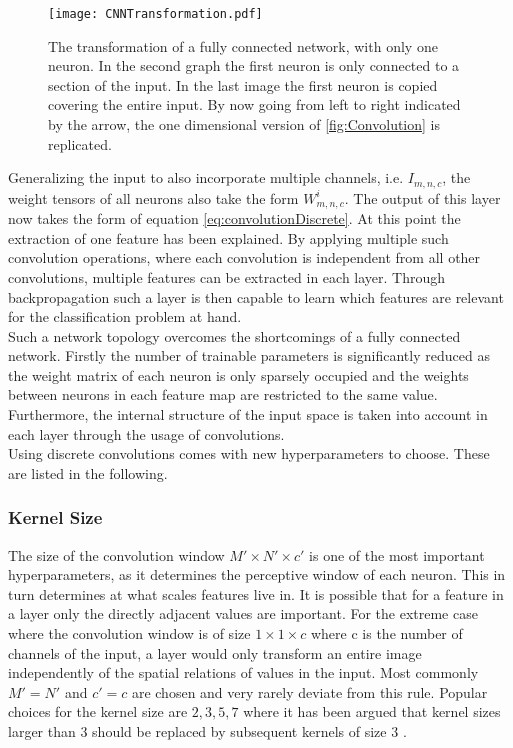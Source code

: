 \begin{figure}[H]
\centering
\texttt{[image: CNNTransformation.pdf]}
\caption{The transformation of a fully connected network, with only one neuron. In the second graph the first neuron is only connected to a section of the input. In the last image the first neuron is copied covering the entire input. By now going from left to right indicated by the arrow, the one dimensional version of \ref{fig:Convolution} is replicated.}
\label{fig:CNNTransformation}
\end{figure}

Generalizing the input to also incorporate multiple channels, i.e. $I_{m,n,c}$, the weight tensors of all neurons also take the form $W^i_{m,n,c}$. The output of this layer now takes the form of equation \ref{eq:convolutionDiscrete}. At this point the extraction of one feature has been explained. By applying multiple such convolution operations, where each convolution is independent from all other convolutions, multiple features can be extracted in each layer. Through backpropagation such a layer is then capable to learn which features are relevant for the classification problem at hand. \\

Such a network topology overcomes the shortcomings of a fully connected network. Firstly the number of trainable parameters is significantly reduced as the weight matrix of each neuron is only sparsely occupied and the weights between neurons in each feature map are restricted to the same value. Furthermore, the internal structure of the input space is taken into account in each layer through the usage of convolutions. \\

Using discrete convolutions comes with new hyperparameters to choose. These are listed in the following.

\subsubsection{Kernel Size}
The size of the convolution window $M' \times N' \times c'$ is one of the most important hyperparameters, as it determines the perceptive window of each neuron. This in turn determines at what scales features live in. It is possible that for a feature in a layer only the directly adjacent values are important. For the extreme case where the convolution window is of size $1\times 1 \times c$ where c is the number of channels of the input, a layer would only transform an entire image independently of the spatial relations of values in the input. Most commonly $M'=N'$ and $c'=c$ are chosen and very rarely deviate from this rule. Popular choices for the kernel size are $2,3,5,7$ where it has been argued that kernel sizes larger than $3$ should be replaced by subsequent kernels of size $3$ \cite{Szegedy2015}. 

